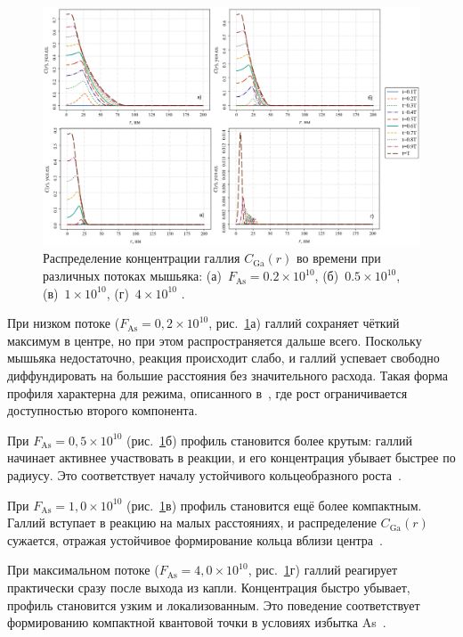 \documentclass[14pt,oneside]{extarticle}
\begin{document}
\begin{figure}[H]
    \begin{center}
    \includegraphics[width=15cm]{images/C_Ga_t_2.png}
    \caption{\label{fig:ga_flux_2} Распределение концентрации галлия $C_{\text{Ga}}(r)$ во времени при различных потоках мышьяка: (а)~$F_{\text{As}} = 0.2 \times 10^{10}$, (б)~$0.5 \times 10^{10}$, (в)~$1 \times 10^{10}$, (г)~$4 \times 10^{10}$ .}
    \end{center}
\end{figure}

При низком потоке ($F_{\text{As}} = 0{,}2 \times 10^{10}$, рис.~\ref{fig:ga_flux_2}а) галлий сохраняет чёткий максимум в центре, но при этом распространяется дальше всего. Поскольку мышьяка недостаточно, реакция происходит слабо, и галлий успевает свободно диффундировать на большие расстояния без значительного расхода. Такая форма профиля характерна для режима, описанного в~\cite{zhou2013}, где рост ограничивается доступностью второго компонента.

При $F_{\text{As}} = 0{,}5 \times 10^{10}$ (рис.~\ref{fig:ga_flux_2}б) профиль становится более крутым: галлий начинает активнее участвовать в реакции, и его концентрация убывает быстрее по радиусу. Это соответствует началу устойчивого кольцеобразного роста~\cite{mano2005nano}.

При $F_{\text{As}} = 1{,}0 \times 10^{10}$ (рис.~\ref{fig:ga_flux_2}в) профиль становится ещё более компактным. Галлий вступает в реакцию на малых расстояниях, и распределение $C_{\text{Ga}}(r)$ сужается, отражая устойчивое формирование кольца вблизи центра~\cite{fan2023}.

При максимальном потоке ($F_{\text{As}} = 4{,}0 \times 10^{10}$, рис.~\ref{fig:ga_flux_2}г) галлий реагирует практически сразу после выхода из капли. Концентрация быстро убывает, профиль становится узким и локализованным. Это поведение соответствует формированию компактной квантовой точки в условиях избытка As~\cite{fan2023evaporation}.
\end{document}
